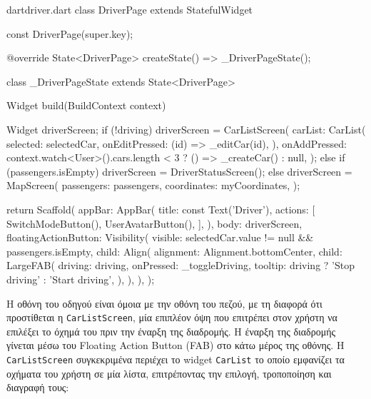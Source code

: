 \documentclass[../thesis.tex]{subfiles}
\begin{document}
\begin{codeblock}{dart}{driver.dart}
  class DriverPage extends StatefulWidget {
    const DriverPage({super.key});

    @override
    State<DriverPage> createState() => _DriverPageState();
  }

  class _DriverPageState extends State<DriverPage> {
    Widget build(BuildContext context) {
      Widget driverScreen;
      if (!driving) {
        driverScreen = CarListScreen(
          carList: CarList(
            selected: selectedCar,
            onEditPressed: (id) => _editCar(id),
          ),
          onAddPressed: context.watch<User>().cars.length < 3
              ? () => _createCar()
              : null,
        );
      } else if (passengers.isEmpty) {
        driverScreen = DriverStatusScreen();
      } else {
        driverScreen = MapScreen(
          passengers: passengers,
          coordinates: myCoordinates,
        );
      }

      return Scaffold(
        appBar: AppBar(
          title: const Text('Driver'),
          actions: [
            SwitchModeButton(),
            UserAvatarButton(),
          ],
        ),
        body: driverScreen,
        floatingActionButton: Visibility(
          visible: selectedCar.value != null && passengers.isEmpty,
          child: Align(
            alignment: Alignment.bottomCenter,
            child: LargeFAB(
              driving: driving,
              onPressed: _toggleDriving,
              tooltip: driving ? 'Stop driving' : 'Start driving',
            ),
          ),
        ),
      );
    }
  }
\end{codeblock}

Η οθόνη του οδηγού είναι όμοια με την οθόνη του πεζού, με τη διαφορά ότι προστίθεται η \texttt{CarListScreen}, μία επιπλέον όψη που επιτρέπει στον χρήστη να επιλέξει το όχημά του πριν την έναρξη της διαδρομής.
Η έναρξη της διαδρομής γίνεται μέσω του Floating Action Button (FAB) στο κάτω μέρος της οθόνης.
Η \texttt{CarListScreen} συγκεκριμένα περιέχει το widget \texttt{CarList} το οποίο εμφανίζει τα οχήματα του χρήστη σε μία λίστα, επιτρέποντας την επιλογή, τροποποίηση και διαγραφή τους:
\end{document}
